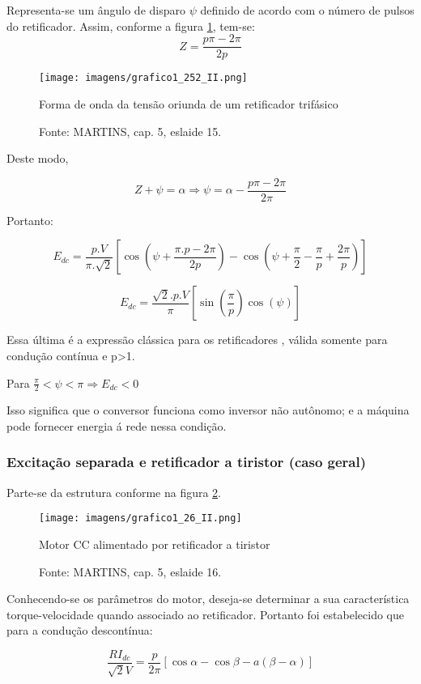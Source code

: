Representa-se um ângulo de disparo $\psi$ definido de acordo com o número de pulsos do retificador. Assim, conforme a figura \ref{fig:G1-252-II}, tem-se:
\[Z = \frac{p\pi - 2\pi}{2p}\]

\begin{figure}[ht!]
\center
\texttt{[image: imagens/grafico1\_252\_II.png]}
\caption{\label{fig:G1-252-II} Forma de onda da tensão oriunda de um retificador trifásico}
\caption*{Fonte: MARTINS, cap. 5, eslaide 15.}
\end{figure}

Deste modo,

\[Z + \psi = \alpha \Rightarrow \psi = \alpha - \frac{p\pi - 2\pi}{2\pi}\]

Portanto:

\[E_{dc} = \frac{p.V}{\pi.\sqrt{2}}\left[\cos\left(\psi + \frac{\pi.p - 2\pi}{2p}\right) - \cos\left(\psi + \frac{\pi}{2} - \frac{\pi}{p} + \frac{2\pi}{p}\right)\right]\]

\[E_{dc} = \frac{\sqrt{2}.p.V}{\pi}\left[\sin\left(\frac{\pi}{p}\right)\cos{(\psi)}\right]\]

Essa última é a expressão clássica para os retificadores , válida somente para condução contínua e p>1.

Para $\frac{\pi}{2} < \psi < \pi  \Rightarrow E_{dc} < 0$

Isso significa que o conversor funciona como inversor não autônomo; e a máquina pode fornecer energia á rede nessa condição. 

\subsubsection{Excitação separada e retificador a tiristor (caso geral)}

Parte-se da estrutura conforme na figura \ref{fig:C1-26-II}.

\begin{figure}[ht!]
\center
\texttt{[image: imagens/grafico1\_26\_II.png]}
\caption{\label{fig:C1-26-II} Motor CC alimentado por retificador a tiristor}
\caption*{Fonte: MARTINS, cap. 5, eslaide 16.}
\end{figure}

Conhecendo-se os parâmetros do motor, deseja-se determinar a sua característica torque-velocidade quando associado ao retificador. Portanto foi estabelecido que para a condução descontínua:

\[\frac{RI_{dc}}{\sqrt{2}V} = \frac{p}{2\pi}\left[\cos\alpha - \cos\beta - a(\beta - \alpha)\right]\]

